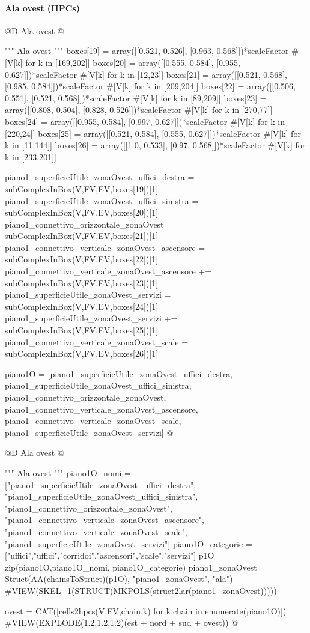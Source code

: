 \documentclass[11pt,oneside]{article}    %
\begin{document}
\paragraph{Ala ovest (HPCs)}
@D Ala ovest
@{""" Ala ovest """
boxes[19] = array([[0.521, 0.526], [0.963, 0.568]])*scaleFactor #[V[k] for k in [169,202]]
boxes[20] = array([[0.555, 0.584], [0.955, 0.627]])*scaleFactor #[V[k] for k in [12,23]]
boxes[21] = array([[0.521, 0.568], [0.985, 0.584]])*scaleFactor #[V[k] for k in [209,204]]
boxes[22] = array([[0.506, 0.551], [0.521, 0.568]])*scaleFactor #[V[k] for k in [89,209]]
boxes[23] = array([[0.808, 0.504], [0.828, 0.526]])*scaleFactor #[V[k] for k in [270,77]]
boxes[24] = array([[0.955, 0.584], [0.997, 0.627]])*scaleFactor #[V[k] for k in [220,24]]
boxes[25] = array([[0.521, 0.584], [0.555, 0.627]])*scaleFactor #[V[k] for k in [11,144]]
boxes[26] = array([[1.0, 0.533], [0.97, 0.568]])*scaleFactor #[V[k] for k in [233,201]]

piano1_superficieUtile_zonaOvest_uffici_destra = subComplexInBox(V,FV,EV,boxes[19])[1]
piano1_superficieUtile_zonaOvest_uffici_sinistra = subComplexInBox(V,FV,EV,boxes[20])[1]
piano1_connettivo_orizzontale_zonaOvest = subComplexInBox(V,FV,EV,boxes[21])[1]
piano1_connettivo_verticale_zonaOvest_ascensore = subComplexInBox(V,FV,EV,boxes[22])[1]
piano1_connettivo_verticale_zonaOvest_ascensore += subComplexInBox(V,FV,EV,boxes[23])[1]
piano1_superficieUtile_zonaOvest_servizi = subComplexInBox(V,FV,EV,boxes[24])[1]
piano1_superficieUtile_zonaOvest_servizi += subComplexInBox(V,FV,EV,boxes[25])[1]
piano1_connettivo_verticale_zonaOvest_scale = subComplexInBox(V,FV,EV,boxes[26])[1]

piano1O = [piano1_superficieUtile_zonaOvest_uffici_destra, piano1_superficieUtile_zonaOvest_uffici_sinistra, piano1_connettivo_orizzontale_zonaOvest, piano1_connettivo_verticale_zonaOvest_ascensore, piano1_connettivo_verticale_zonaOvest_scale, piano1_superficieUtile_zonaOvest_servizi]
@}

@D Ala ovest
@{""" Ala ovest """
piano1O_nomi = ["piano1_superficieUtile_zonaOvest_uffici_destra", "piano1_superficieUtile_zonaOvest_uffici_sinistra", "piano1_connettivo_orizzontale_zonaOvest", "piano1_connettivo_verticale_zonaOvest_ascensore", "piano1_connettivo_verticale_zonaOvest_scale", "piano1_superficieUtile_zonaOvest_servizi"]
piano1O_categorie = ["uffici","uffici","corridoi","ascensori","scale","servizi"]
p1O = zip(piano1O,piano1O_nomi, piano1O_categorie)
piano1_zonaOvest = Struct(AA(chainsToStruct)(p1O), "piano1_zonaOvest", "ala")
#VIEW(SKEL_1(STRUCT(MKPOLS(struct2lar(piano1_zonaOvest)))))
    
ovest = CAT([cells2hpcs(V,FV,chain,k) for k,chain in enumerate(piano1O)])
#VIEW(EXPLODE(1.2,1.2,1.2)(est + nord + sud + ovest))
@}
\end{document}

